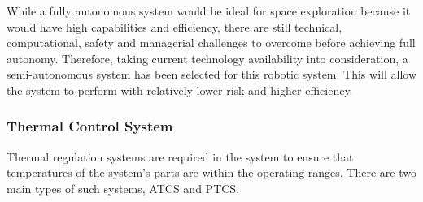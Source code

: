 While a fully autonomous system would be ideal for space exploration because it would have high capabilities and efficiency, there are still technical, computational, safety and managerial challenges to overcome before achieving full autonomy. Therefore, taking current technology availability into consideration, a semi-autonomous system has been selected for this robotic system. This will allow the system to perform with relatively lower risk and higher efficiency.

\subsubsection{Thermal Control System}
Thermal regulation systems are required in the system to ensure that temperatures of the system's parts are within the operating ranges. There are two main types of such systems, \gls{ATCS} and \gls{PTCS}. 

